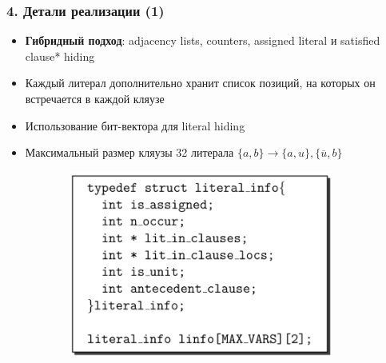 \documentclass[aspectratio=169,xcolor=table,english]{beamer}
\begin{document}
\begin{frame}[fragile] \frametitle{4. Детали реализации (1)}
    \begin{minipage}[m]{0.5\linewidth}
        \begin{itemize}
            \item \textbf{Гибридный подход}: adjacency lists, counters, assigned literal и satisfied clause* hiding
            \item Каждый литерал дополнительно хранит список позиций, на которых он встречается в каждой кляузе
            \item Использование бит-вектора для literal hiding
            \item Максимальный размер кляузы 32 литерала $\{a,b\} \rightarrow \{a,u\},\{\overline{u},b\}$
        \end{itemize}
    \end{minipage}\hfill
    \begin{minipage}[m]{0.45\linewidth}
        \begin{figure}
            \centering
            \begin{subfigure}[b]{0.49\textwidth}
                \centering
                \includegraphics[width=0.95\textwidth]{figures/structure literal.png}
            \end{subfigure}
            \hfill
            \begin{subfigure}[b]{0.49\textwidth}
                \centering

\end{subfigure}
\end{figure}
\end{minipage}
\end{frame}
\end{document}

